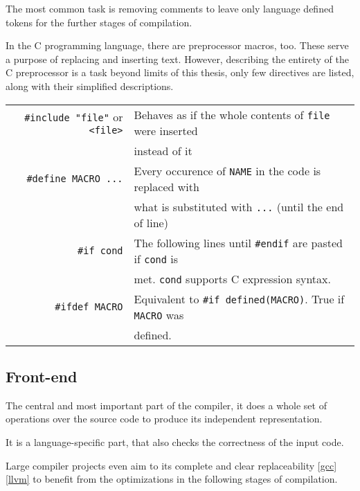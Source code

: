         The most common task is removing comments to leave only language defined tokens for the further stages of compilation.

        In the C programming language, there are preprocessor macros, too. These serve a purpose of replacing and inserting text. However, describing the entirety of the C preprocessor is a task beyond limits of this thesis, only few directives are listed, along with their simplified descriptions.

        \begin{center}\begin{tabular}{r|l}
            \verb|#include "file"| or \verb|<file>| & Behaves as if the whole contents of \verb|file| were inserted \\
            & instead of it\\
            \verb|#define MACRO ...| & Every occurence of \verb|NAME| in the code is replaced with \\
            & what is substituted with \verb|...| (until the end of line)\\
            \verb|#if cond| & The following lines until \verb|#endif| are pasted if \verb|cond| is\\
            & met. \verb|cond| supports C expression syntax.\\
            \verb|#ifdef MACRO| & Equivalent to \verb|#if defined(MACRO)|. True if \verb|MACRO| was\\
            & defined.\\
        \end{tabular}\end{center}

        \subsection{Front-end}

            The central and most important part of the compiler, it does a whole set of operations over the source code to produce its independent representation.

            It is a language-specific part, that also checks the correctness of the input code.

            Large compiler projects even aim to its complete and clear replaceability \ref{gcc} \ref{llvm} to benefit from the optimizations in the following stages of compilation.

